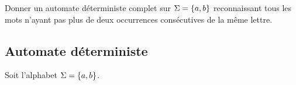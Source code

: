 \documentclass[a4paper,french,bookmarks]{book}
\begin{document}
    Donner un automate déterministe complet sur $\Sigma = \left\{a, b\right\}$ reconnaissant tous les mots n'ayant pas plus de deux occurrences consécutives de la même lettre.
    
    
    \subsection{Automate déterministe}
    
    Soit l'alphabet $\Sigma = \left\{a, b\right\}$.
    
\end{document}
